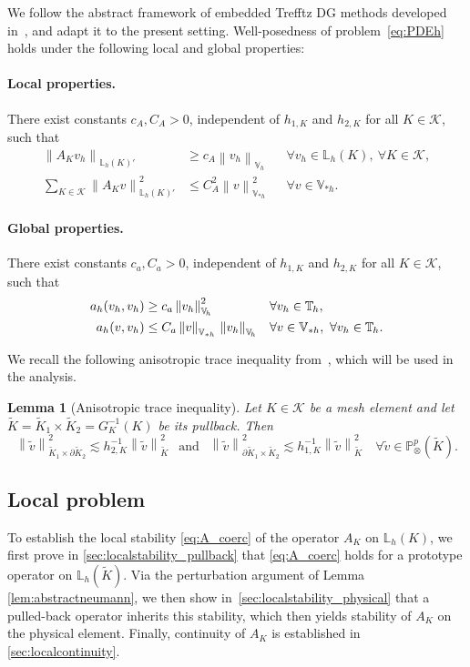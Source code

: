 \documentclass[a4paper,twoside,10pt]{article}
\newtheorem{lemma}[theorem]{Lemma}
\newcommand{\CA}{C_A}
\newcommand{\Ca}{C_a}
\newcommand{\ca}{c_a}
\newcommand{\cA}{c_A}
\newcommand{\Vsh}{V_{\!\star \hspace*{-0.2mm}h}}
\newcommand{\dgsnorm}[1]{\norm{#1}_{\Vsh}}
\newcommand{\AK}{{A_K}}
\newcommand{\Lh}{\mathbb{L}_h}
\newcommand{\LKh}{\mathbb{L}_h(K)}
\newcommand*{\norm}[1]{\left\|#1\right\|}
\newcommand{\IL}{\mathbb{L}}
\newcommand{\IP}{\mathbb{P}}
\newcommand{\calK}{\mathcal{K}}
\numberwithin{equation}{section}
\newcommand{\Vh}{\mathbb{V}_{\! h}}
\newcommand{\ITh}{\mathbb{T}_{\mspace{-1.5mu} h}}
\renewcommand{\Vsh}{\mathbb{V}_{*h}}
\newcommand{\Kt}{\widetilde{K}}
\newcommand{\hKot}{h_{1,K}}
\newcommand{\hKtt}{h_{2,K}}
\begin{document}
We follow 
the abstract framework of embedded Trefftz DG methods developed in~\cite{LLSV_ARXIV_2024}, and adapt it to the present setting. 
	Well-posedness of problem~\eqref{eq:PDEh} holds under the following local and global properties:

\paragraph{Local properties.} There exist constants $\cA,\CA>0$, independent of $\hKot$ and $\hKtt$ for all $K\in\calK$, such that
	\begin{align}
		\norm{\AK v_h}_{\LKh'} &\ge \cA \norm{v_h}_{\Vh}
		&&\forall v_h \in \Lh(K),\ \forall K\in\calK, \label{eq:A_coerc}\\
		\sum_{K\in\calK} \norm{\AK v}_{\LKh'}^2 &\le \CA^2 \dgsnorm{v}^2
		&&\forall v\in \Vsh. \label{eq:A_cont}
	\end{align}

	\paragraph{Global properties.} There exist constants $\ca,\Ca>0$, independent of  $\hKot$ and $\hKtt$ for all $K\in\calK$,  such that
	\begin{align}
		a_h(v_h,v_h) &\ge \ca \norm{v_h}_{\Vh}^2
		&&\forall v_h\in \ITh, \label{eq:acoerc}\\
		a_h(v,v_h) &\le \Ca \dgsnorm{v}\,\norm{v_h}_{\Vh}
		&&\forall v\in \Vsh,\ \forall v_h\in \ITh. \label{eq:ah_cont}
	\end{align}
	
We recall the following anisotropic trace inequality from~\cite[Corollary 3.49]{G03dm}, which will be used in the analysis.
	\begin{lemma}[Anisotropic trace inequality]
		Let $K\in\calK$ be a mesh element and let $\Kt = \Kt_1 \times \Kt_2=G_K^{-1}(K)$ be its pullback. Then
		\begin{equation}\label{eq:anisotropictraceineq}
			\norm{\tilde v}_{\Kt_1\times\partial\Kt_2}^2\lesssim \hKtt^{-1}\norm{\tilde v}_{\Kt}^2 
			\ \  \text{ and } \ \
			\norm{\tilde v}_{\partial\Kt_1\times\Kt_2}^2\lesssim \hKot^{-1}\norm{\tilde v}_{\Kt}^2 
			\quad \forall \tilde v \in \IP^p_\otimes(\Kt).
		\end{equation}
	\end{lemma}
	
	
	\subsection{Local problem}\label{sec:local}
	To establish the local stability \eqref{eq:A_coerc} of the  operator $A_K $ on $\IL_h(K)$, we first prove in \cref{sec:localstability_pullback} that \eqref{eq:A_coerc} 
    holds for a prototype operator on $\IL_h(\Kt)$.
    Via the perturbation argument of Lemma \ref{lem:abstractneumann}, we then show in~\cref{sec:localstability_physical} that a pulled-back operator  inherits 
	this stability, which  then yields 
	stability of $A_K$ on the physical element.
	Finally, continuity of $A_K$ is established in \cref{sec:localcontinuity}.
\end{document}
